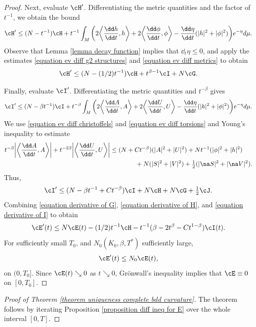 \documentclass[hidelinks, 12pt, oneside, reqno]{amsart}
\begin{document}
\begin{proof}
Next, evaluate $\cH'$. Differentiating the metric quantities and the factor of $t^{-1}$, we obtain the bound
\[
\cH' \le (N-t^{-1})\cH + t^{-1}\int_M \bigg( 2 \bigg\langle \frac{\dd h}{\dd t}, h \bigg \rangle + 2  \bigg\langle \frac{\dd \phi}{\dd t}, \phi \bigg \rangle  - \frac{\dd \eta}{\dd t}(|h|^2 + |\phi|^2) \bigg)e^{-\eta} d\mu.
\]
Observe that Lemma \ref{lemma decay function} implies that $\dd_t \eta \le 0$, and apply the estimates \eqref{equation ev diff g2 structures} and \eqref{equation ev diff metrics} to obtain
\begin{equation}\label{equation derivative of H}
\cH' \le (N - (1/2)t^{-1}) \cH + t^{\beta-1} \cI + N\cG.
\end{equation}

Finally, evaluate $\cI'$. Differentiating the metric quantities and $t^{-\beta}$ gives 
\begin{align*}
    \cI' \le (N-\beta t^{-1})\cI + t^{-\beta} \int_M \bigg( 2 \bigg\langle \frac{\dd A}{\dd t}, A \bigg \rangle + 2  \bigg\langle \frac{\dd U}{\dd t}, U \bigg \rangle  - \frac{\dd \eta}{\dd t}(|h|^2 + |\phi|^2) \bigg)e^{-\eta} d\mu.
\end{align*}
We use \eqref{equation ev diff christoffels} and \eqref{equation ev diff torsions} and Young's inequality to estimate
\begin{align*}
    t^{- \beta}\bigg| \bigg\langle \frac{\dd A}{\dd t}, A \bigg \rangle \bigg| + t^{-2\beta} \bigg| \bigg\langle \frac{\dd U}{\dd t}, U \bigg \rangle \bigg|
    & \le  (N + Ct^{-\beta})(|A|^2 + |U|^2) + Nt^{-1}(|\phi|^2 + |h|^2) \\ 
    &\qquad \qquad+ N(|S|^2 + |V|^2) + \tfrac12(|\na S|^2 + |\na V|^2).
\end{align*}
Thus, 
\begin{equation}\label{equation derivative of I}
    \cI' \le (N-\beta t^{-1} + Ct^{-\beta})\cI + N\cH + N\cG + \tfrac12 \cJ.
\end{equation}
Combining \eqref{equation derivative of G}, \eqref{equation derivative of H}, and \eqref{equation derivative of I} to obtain
\[
\cE'(t) \le N\cE(t) -(1/2)t^{-1} \cH - t^{-1}(\beta - 2t^\beta - Ct^{1-\beta})\cI(t).
\]
For sufficiently small $T_0$, and $N_0(K_0, \beta, T^*)$ sufficiently large, 
\[
\cE'(t) \le N_0 \cE(t),
\]
on $(0,T_0]$. Since $\cE(t) \searrow 0$ as $t \searrow 0$, Gr\"onwall's inequality implies that $\cE \equiv 0$ on $[0, T_0]$.
\end{proof}

\begin{proof}[Proof of Theorem \ref{theorem uniqueness complete bdd curvature}]
The theorem follows by iterating Proposition \ref{proposition diff ineq for E} over the whole interval $[0,T]$.
\end{proof}
\end{document}
